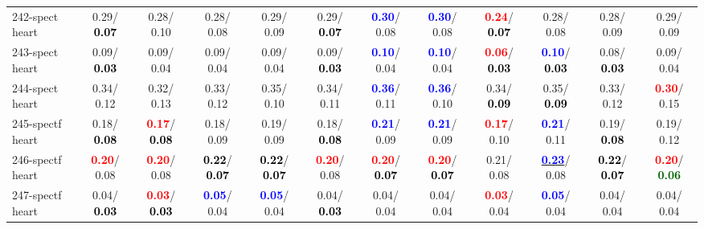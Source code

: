\begin{table}[h]
\begin{center}
{\begin{tabular}{lc|c|c|c|c|c|c|c|c|c|c}
242-spect heart &   0.29/\textcolor{black}{\textbf{  0.07}} &   0.28/  0.10 &   0.28/  0.08 &   0.29/  0.09 &   0.29/\textcolor{black}{\textbf{  0.07}} & \textcolor{blue}{\textbf{  0.30}}/  0.08 & \textcolor{blue}{\textbf{  0.30}}/  0.08 & \textcolor{red}{\textbf{  0.24}}/\textcolor{black}{\textbf{  0.07}} &   0.28/  0.08 &   0.28/  0.09 &   0.29/  0.09 \\
243-spect heart &   0.09/\textcolor{black}{\textbf{  0.03}} &   0.09/  0.04 &   0.09/  0.04 &   0.09/  0.04 &   0.09/\textcolor{black}{\textbf{  0.03}} & \textcolor{blue}{\textbf{  0.10}}/  0.04 & \textcolor{blue}{\textbf{  0.10}}/  0.04 & \textcolor{red}{\textbf{  0.06}}/\textcolor{black}{\textbf{  0.03}} & \textcolor{blue}{\textbf{  0.10}}/\textcolor{black}{\textbf{  0.03}} &   0.08/\textcolor{black}{\textbf{  0.03}} &   0.09/  0.04 \\
244-spect heart &   0.34/  0.12 &   0.32/  0.13 &   0.33/  0.12 &   0.35/  0.10 &   0.34/  0.11 & \textcolor{blue}{\textbf{  0.36}}/  0.11 & \textcolor{blue}{\textbf{  0.36}}/  0.10 &   0.34/\textcolor{black}{\textbf{  0.09}} &   0.35/\textcolor{black}{\textbf{  0.09}} &   0.33/  0.12 & \textcolor{red}{\textbf{  0.30}}/  0.15 \\
245-spectf heart &   0.18/\textcolor{black}{\textbf{  0.08}} & \textcolor{red}{\textbf{  0.17}}/\textcolor{black}{\textbf{  0.08}} &   0.18/  0.09 &   0.19/  0.09 &   0.18/\textcolor{black}{\textbf{  0.08}} & \textcolor{blue}{\textbf{  0.21}}/  0.09 & \textcolor{blue}{\textbf{  0.21}}/  0.09 & \textcolor{red}{\textbf{  0.17}}/  0.10 & \textcolor{blue}{\textbf{  0.21}}/  0.11 &   0.19/\textcolor{black}{\textbf{  0.08}} &   0.19/  0.12 \\ \hline
246-spectf heart & \textcolor{red}{\textbf{  0.20}}/  0.08 & \textcolor{red}{\textbf{  0.20}}/  0.08 & \textcolor{black}{\textbf{  0.22}}/\textcolor{black}{\textbf{  0.07}} & \textcolor{black}{\textbf{  0.22}}/\textcolor{black}{\textbf{  0.07}} & \textcolor{red}{\textbf{  0.20}}/  0.08 & \textcolor{red}{\textbf{  0.20}}/\textcolor{black}{\textbf{  0.07}} & \textcolor{red}{\textbf{  0.20}}/\textcolor{black}{\textbf{  0.07}} &   0.21/  0.08 & \underline{\textcolor{blue}{\textbf{  0.23}}}/  0.08 & \textcolor{black}{\textbf{  0.22}}/\textcolor{black}{\textbf{  0.07}} & \textcolor{red}{\textbf{  0.20}}/\textcolor{darkgreen}{\textbf{  0.06}} \\
247-spectf heart &   0.04/\textcolor{black}{\textbf{  0.03}} & \textcolor{red}{\textbf{  0.03}}/\textcolor{black}{\textbf{  0.03}} & \textcolor{blue}{\textbf{  0.05}}/  0.04 & \textcolor{blue}{\textbf{  0.05}}/  0.04 &   0.04/\textcolor{black}{\textbf{  0.03}} &   0.04/  0.04 &   0.04/  0.04 & \textcolor{red}{\textbf{  0.03}}/  0.04 & \textcolor{blue}{\textbf{  0.05}}/  0.04 &   0.04/  0.04 &   0.04/  0.04 \\

\end{tabular}}
\end{center}
\end{table}
